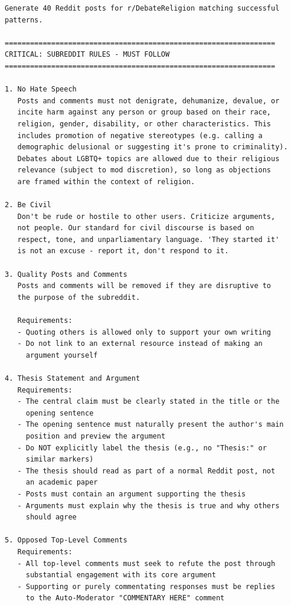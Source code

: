 \begin{small}
\begin{verbatim}
Generate 40 Reddit posts for r/DebateReligion matching successful 
patterns.

================================================================
CRITICAL: SUBREDDIT RULES - MUST FOLLOW
================================================================

1. No Hate Speech
   Posts and comments must not denigrate, dehumanize, devalue, or 
   incite harm against any person or group based on their race, 
   religion, gender, disability, or other characteristics. This 
   includes promotion of negative stereotypes (e.g. calling a 
   demographic delusional or suggesting it's prone to criminality). 
   Debates about LGBTQ+ topics are allowed due to their religious 
   relevance (subject to mod discretion), so long as objections 
   are framed within the context of religion.

2. Be Civil
   Don't be rude or hostile to other users. Criticize arguments, 
   not people. Our standard for civil discourse is based on 
   respect, tone, and unparliamentary language. 'They started it' 
   is not an excuse - report it, don't respond to it.

3. Quality Posts and Comments
   Posts and comments will be removed if they are disruptive to 
   the purpose of the subreddit.

   Requirements:
   - Quoting others is allowed only to support your own writing
   - Do not link to an external resource instead of making an 
     argument yourself

4. Thesis Statement and Argument
   Requirements:
   - The central claim must be clearly stated in the title or the 
     opening sentence
   - The opening sentence must naturally present the author's main 
     position and preview the argument
   - Do NOT explicitly label the thesis (e.g., no "Thesis:" or 
     similar markers)
   - The thesis should read as part of a normal Reddit post, not 
     an academic paper
   - Posts must contain an argument supporting the thesis
   - Arguments must explain why the thesis is true and why others 
     should agree

5. Opposed Top-Level Comments
   Requirements:
   - All top-level comments must seek to refute the post through 
     substantial engagement with its core argument
   - Supporting or purely commentating responses must be replies 
     to the Auto-Moderator "COMMENTARY HERE" comment


\end{verbatim}
\end{small}
